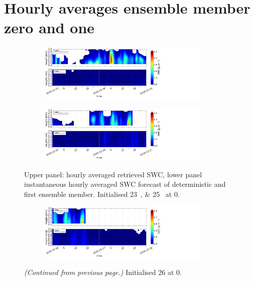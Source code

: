\section{Hourly averages ensemble member zero and one}%
\label{app:EM1h}

\begin{figure}[H]%
	\centering
	\begin{subfigure}[t]{\textwidth}
		\centering
		\includegraphics[trim={0.cm 0.8cm 19.cm 0.5cm},clip,width=0.9\textwidth]{./fig_vert_SWC_1h/20161223}
		\caption{}\label{fig:SWC1h:23}
	\end{subfigure}
	\begin{subfigure}[t]{\textwidth}
		\centering
		\includegraphics[trim={0.cm 0.8cm 19.cm 0.5cm},clip,width=0.9\textwidth]{./fig_vert_SWC_1h/20161225}
		\caption{}\label{fig:SWC1h:25}
	\end{subfigure}
	\caption{Upper panel: hourly averaged retrieved SWC, lower panel instantaneous hourly averaged SWC forecast of deterministic and first ensemble member. Initialised \SIlist{23;25}{\dec} at \SI{0}{\UTC}. }\label{fig:SWC_1h}
\end{figure}
\begin{figure}[t]\ContinuedFloat
	\centering
	\begin{subfigure}[t]{\textwidth}
		\centering
		\includegraphics[trim={0.cm 0.8cm 19.cm 0.5cm},clip,width=0.9\textwidth]{./fig_vert_SWC_1h/20161226}
		\caption{}\label{fig:SWC1h:26}
	\end{subfigure}
	\caption{\textit{(Continued from previous page.)} Initialised \SI{26}{\dec} at \SI{0}{\UTC}.}   
\end{figure}
